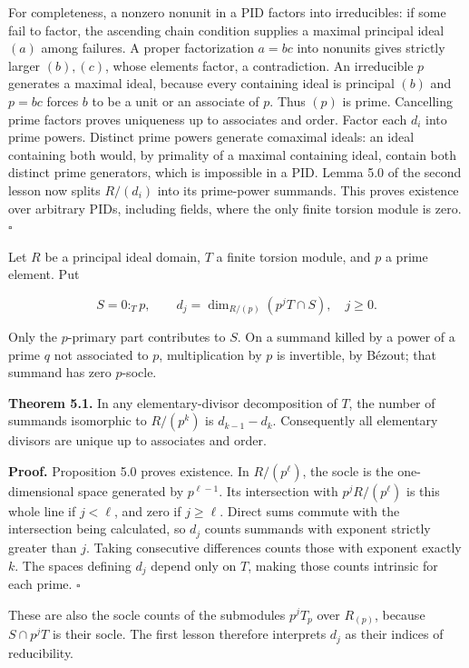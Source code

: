 \documentclass[
]{article}
\begin{document}
For completeness, a nonzero nonunit in a PID factors into irreducibles:
if some fail to factor, the ascending chain condition supplies a maximal
principal ideal \((a)\) among failures. A proper factorization \(a=bc\)
into nonunits gives strictly larger \((b),(c)\), whose elements factor,
a contradiction. An irreducible \(p\) generates a maximal ideal, because
every containing ideal is principal \((b)\) and \(p=bc\) forces \(b\) to
be a unit or an associate of \(p\). Thus \((p)\) is prime. Cancelling
prime factors proves uniqueness up to associates and order. Factor each
\(d_i\) into prime powers. Distinct prime powers generate comaximal
ideals: an ideal containing both would, by primality of a maximal
containing ideal, contain both distinct prime generators, which is
impossible in a PID. Lemma 5.0 of the second lesson now splits
\(R/(d_i)\) into its prime-power summands. This proves existence over
arbitrary PIDs, including fields, where the only finite torsion module
is zero. \(\square\)

Let \(R\) be a principal ideal domain, \(T\) a finite torsion module,
and \(p\) a prime element. Put

\[
S=0:_T p,\qquad d_j=\dim_{R/(p)}(p^jT\cap S),\quad j\ge0.
\]

Only the \(p\)-primary part contributes to \(S\). On a summand killed by
a power of a prime \(q\) not associated to \(p\), multiplication by
\(p\) is invertible, by Bézout; that summand has zero \(p\)-socle.

\textbf{Theorem 5.1.} In any elementary-divisor decomposition of \(T\),
the number of summands isomorphic to \(R/(p^k)\) is \(d_{k-1}-d_k\).
Consequently all elementary divisors are unique up to associates and
order.

\textbf{Proof.} Proposition 5.0 proves existence. In \(R/(p^\ell)\), the
socle is the one-dimensional space generated by \(p^{\ell-1}\). Its
intersection with \(p^jR/(p^\ell)\) is this whole line if \(j<\ell\),
and zero if \(j\ge\ell\). Direct sums commute with the intersection
being calculated, so \(d_j\) counts summands with exponent strictly
greater than \(j\). Taking consecutive differences counts those with
exponent exactly \(k\). The spaces defining \(d_j\) depend only on
\(T\), making those counts intrinsic for each prime. \(\square\)

These are also the socle counts of the submodules \(p^jT_p\) over
\(R_{(p)}\), because \(S\cap p^jT\) is their socle. The first lesson
therefore interprets \(d_j\) as their indices of reducibility.
\end{document}
